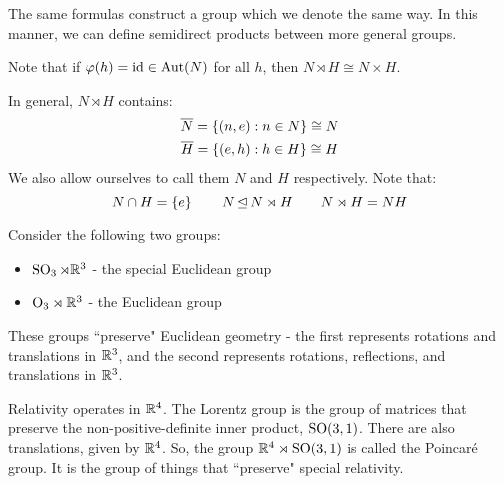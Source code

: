 The same formulas construct a group which we denote the same way.
In this manner, we can define semidirect products between more general groups.

Note that if $ \operatorname{\varphi}(h) = \textrm{id} \in \operatorname{Aut}(N) $ for all $ h $,
then $ N \rtimes H \cong N \times H $.

In general, $ N \rtimes H $ contains:
\begin{gather*}
    \overline{N} = \left\{{(n, e) : n \in N}\right\} \cong N \\
    \overline{H} = \left\{{(e, h) : h \in H}\right\} \cong H
\end{gather*}
We also allow ourselves to call them $ N $ and $ H $ respectively. Note that:
\begin{equation*}
    N \cap H = \left\{{e}\right\} \qquad N \operatorname{\trianglelefteq} N \rtimes H \qquad N \rtimes H = NH
\end{equation*}

\begin{xmp}[source=Primary Source Material]
    Consider the following two groups:
    \begin{itemize}
        \item $ \operatorname{SO}_{3} \rtimes \mathbb{R}^{3} $ - the special Euclidean group
        \item $ \textrm{O}_{3} \rtimes \mathbb{R}^{3} $ - the Euclidean group
    \end{itemize}
    These groups ``preserve" Euclidean geometry - the first represents rotations and translations
    in $ \mathbb{R}^{3} $, and the second represents rotations, reflections,
    and translations in $ \mathbb{R}^{3} $.
\end{xmp}

\begin{xmp}[source=Primary Source Material,title=Lorentz and Poincare group]
    Relativity operates in $ \mathbb{R}^{4} $. \vsp
    The Lorentz group is the group of matrices that preserve the non-positive-definite inner
    product, $ \operatorname{SO}(3, 1) $. There are also translations, given by $ \mathbb{R}^{4} $. \vsp
    So, the group $ \mathbb{R}^{4} \rtimes \operatorname{SO}(3, 1) $ is called the Poincar\'e group.
    It is the group of things that ``preserve" special relativity.
\end{xmp}

